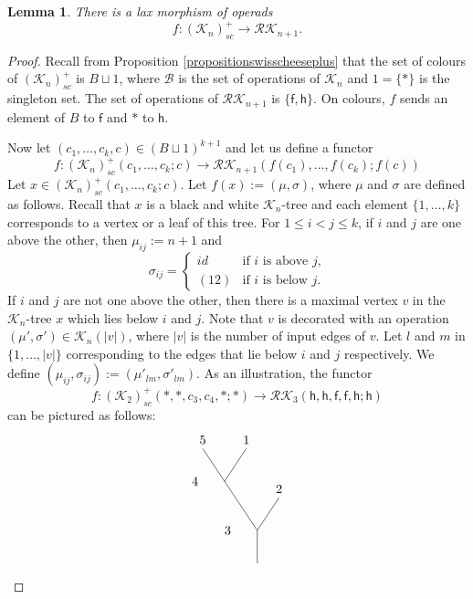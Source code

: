 \documentclass[10pt,a4paper]{amsart}
\newtheorem{lemma}{Lemma}
\begin{document}
\begin{lemma}\label{lemmaexistencecomplexitymap}
	There is a lax morphism of operads
	\begin{equation}\label{equationmapc}
		f: (\mathcal{K}_n)_{sc}^+ \to \mathcal{RK}_{n+1}.
	\end{equation}
\end{lemma}

\begin{proof}
	Recall from Proposition \ref{propositionswisscheeseplus} that the set of colours of $(\mathcal{K}_n)_{sc}^+$ is $B \sqcup 1$, where $\mathcal{B}$ is the set of operations of $\mathcal{K}_n$ and $1 = \{*\}$ is the singleton set. The set of operations of $\mathcal{RK}_{n+1}$ is $\{\mathsf{f},\mathsf{h}\}$. On colours, $f$ sends an element of $B$ to $\mathsf{f}$ and $*$ to $\mathsf{h}$.
	
	Now let $(c_1,\ldots,c_k,c) \in (B \sqcup 1)^{k+1}$ and let us define a functor
	\[
	f: (\mathcal{K}_n)_{sc}^+(c_1,\ldots,c_k;c) \to \mathcal{RK}_{n+1}(f(c_1),\ldots,f(c_k);f(c))
	\]
	Let $x \in (\mathcal{K}_n)_{sc}^+(c_1,\ldots,c_k;c)$. Let $f(x) := (\mu,\sigma)$, where $\mu$ and $\sigma$ are defined as follows. Recall that $x$ is a black and white $\mathcal{K}_n$-tree and each element $\{1,\ldots,k\}$ corresponds to a vertex or a leaf of this tree. For $1 \leq i < j \leq k$, if $i$ and $j$ are one above the other, then $\mu_{ij}:=n+1$ and
	\[
	\sigma_{ij} = 
	\begin{cases}
	id &\text{if $i$ is above $j$,} \\
	(12) &\text{if $i$ is below $j$.}
	\end{cases}
	\]
	If $i$ and $j$ are not one above the other, then there is a maximal vertex $v$ in the $\mathcal{K}_n$-tree $x$ which lies below $i$ and $j$. Note that $v$ is decorated with an operation $(\mu',\sigma') \in \mathcal{K}_n(|v|)$, where $|v|$ is the number of input edges of $v$. Let $l$ and $m$ in $\{1,\ldots,|v|\}$ corresponding to the edges that lie below $i$ and $j$ respectively. We define $(\mu_{ij},\sigma_{ij}) := (\mu'_{lm},\sigma'_{lm})$. As an illustration, the functor
	\begin{equation}\label{equationexamplecomplexitymap}
		f: (\mathcal{K}_2)_{sc}^+(*,*,c_3,c_4,*;*) \to \mathcal{RK}_3(\mathsf{h},\mathsf{h},\mathsf{f},\mathsf{f},\mathsf{h};\mathsf{h})
	\end{equation}
	can be pictured as follows:
	\[
	\begin{tikzpicture}
	\draw (0,-.9) -- (0,0) -- (-1.5,2.25) node[above]{\large{$5$}};
	\draw (0,0) -- (.6,.9) node[above]{\large{$2$}};
	\draw (-.9,1.35) -- (-.3,2.25) node[above]{\large{$1$}};
	\draw (-.6,0) node[left]{\large{$3$}};
	\draw (-1.5,1.35) node[left]{\large{$4$}};
	

\end{tikzpicture}\]
\end{proof}
\end{document}
